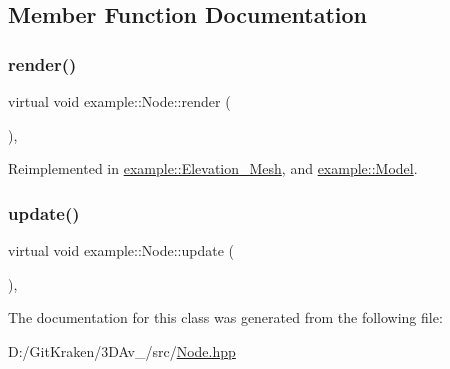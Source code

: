 \subsection{Member Function Documentation}
\mbox{\label{classexample_1_1_node_a6e9c30ac62693f7fa0a4080202df45df}} 
\subsubsection{\texorpdfstring{render()}{render()}}
{\footnotesize\ttfamily virtual void example\+::\+Node\+::render (\begin{DoxyParamCaption}{ }\end{DoxyParamCaption})\hspace{0.3cm}{\ttfamily [inline]}, {\ttfamily [virtual]}}



Reimplemented in \mbox{\hyperlink{classexample_1_1_elevation___mesh_a67216abcf32e92e3da91810e10822c6e}{example\+::\+Elevation\+\_\+\+Mesh}}, and \mbox{\hyperlink{classexample_1_1_model_ade64225bbb0381bbd5a8dddeac81d983}{example\+::\+Model}}.

\mbox{\label{classexample_1_1_node_a6d570b9e13063686b8057d8f561e196e}} 
\subsubsection{\texorpdfstring{update()}{update()}}
{\footnotesize\ttfamily virtual void example\+::\+Node\+::update (\begin{DoxyParamCaption}{ }\end{DoxyParamCaption})\hspace{0.3cm}{\ttfamily [inline]}, {\ttfamily [virtual]}}



The documentation for this class was generated from the following file\+:\begin{DoxyCompactItemize}
\item 
D\+:/\+Git\+Kraken/3\+D\+Av\+\_/src/\mbox{\hyperlink{_node_8hpp}{Node.\+hpp}}\end{DoxyCompactItemize}
